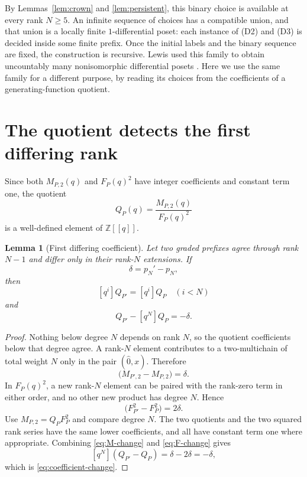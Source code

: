 \documentclass[11pt]{amsart}
\newtheorem{lemma}[theorem]{Lemma}
\theoremstyle{remark}
\newcommand{\Z}{\mathbb{Z}}
\begin{document}
By Lemmas~\ref{lem:crown} and \ref{lem:persistent}, this binary choice is available at every rank $N\geq5$. An infinite sequence of choices has a compatible union, and that union is a locally finite $1$-differential poset: each instance of (D2) and (D3) is decided inside some finite prefix. Once the initial labels and the binary sequence are fixed, the construction is recursive. Lewis used this family to obtain uncountably many nonisomorphic differential posets \cite{Lew07}. Here we use the same family for a different purpose, by reading its choices from the coefficients of a generating-function quotient.

\section{The quotient detects the first differing rank}

Since both $M_{P,2}(q)$ and $F_P(q)^2$ have integer coefficients and constant term one, the quotient
\[
Q_P(q)=\frac{M_{P,2}(q)}{F_P(q)^2}
\]
is a well-defined element of $\Z[[q]]$.

\begin{lemma}[First differing coefficient]\label{lem:coefficient}
Let two graded prefixes agree through rank $N-1$ and differ only in their rank-$N$ extensions. If
\[
\delta=p_N'-p_N,
\]
then
\[
[q^i]Q_{P'}=[q^i]Q_P\quad (i<N)
\]
and
\begin{equation}
[q^N]Q_{P'}-[q^N]Q_P=-\delta.
\label{eq:coefficient-change}
\end{equation}
\end{lemma}

\begin{proof}
Nothing below degree $N$ depends on rank $N$, so the quotient coefficients below that degree agree. A rank-$N$ element contributes to a two-multichain of total weight $N$ only in the pair $(\widehat{0},x)$. Therefore
\begin{equation}
[q^N]\bigl(M_{P',2}-M_{P,2}\bigr)=\delta.
\label{eq:M-change}
\end{equation}
In $F_P(q)^2$, a new rank-$N$ element can be paired with the rank-zero term in either order, and no other new product has degree $N$. Hence
\begin{equation}
[q^N]\bigl(F_{P'}^2-F_P^2\bigr)=2\delta.
\label{eq:F-change}
\end{equation}
Use $M_{P,2}=Q_PF_P^2$ and compare degree $N$. The two quotients and the two squared rank series have the same lower coefficients, and all have constant term one where appropriate. Combining \eqref{eq:M-change} and \eqref{eq:F-change} gives
\[
[q^N](Q_{P'}-Q_P)=\delta-2\delta=-\delta,
\]
which is \eqref{eq:coefficient-change}.
\end{proof}
\end{document}
